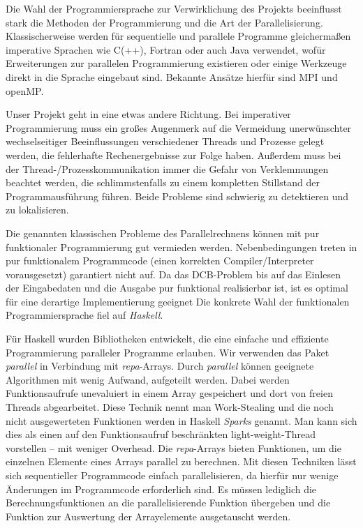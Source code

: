 \documentclass[a4paper]{scrartcl}
\begin{document}
Die Wahl der Programmiersprache zur Verwirklichung des Projekts beeinflusst stark die Methoden der Programmierung und die Art der Parallelisierung. Klassischerweise werden für sequentielle und parallele Programme gleichermaßen imperative Sprachen wie C(++), Fortran oder auch Java verwendet, wofür Erweiterungen zur parallelen Programmierung existieren oder einige Werkzeuge direkt in die Sprache eingebaut sind. Bekannte Ansätze hierfür sind MPI und openMP. \par
Unser Projekt geht in eine etwas andere Richtung. Bei imperativer Programmierung muss ein großes Augenmerk auf die Vermeidung unerwünschter wechselseitiger Beeinflussungen verschiedener Threads und Prozesse gelegt werden, die fehlerhafte Rechenergebnisse zur Folge haben. Außerdem muss bei der Thread-/Prozesskommunikation immer die Gefahr von Verklemmungen beachtet werden, die schlimmstenfalls zu einem kompletten Stillstand der Programmausführung führen. Beide Probleme sind schwierig zu detektieren und zu lokalisieren.\par
Die genannten klassischen Probleme des Parallelrechnens können mit pur funktionaler Programmierung gut vermieden werden. Nebenbedingungen treten in pur funktionalem Programmcode (einen korrekten Compiler/Interpreter vorausgesetzt) garantiert nicht auf. Da das DCB-Problem bis auf das Einlesen der Eingabedaten und die Ausgabe pur funktional realisierbar ist, ist es optimal für eine derartige Implementierung geeignet Die konkrete Wahl der funktionalen Programmiersprache fiel auf \emph{Haskell}. \par
\medskip
Für Haskell wurden Bibliotheken entwickelt, die eine einfache und effiziente Programmierung paralleler Programme erlauben. Wir verwenden das Paket \emph{parallel} in Verbindung mit \emph{repa}-Arrays. Durch \emph{parallel} können geeignete Algorithmen mit wenig Aufwand, aufgeteilt werden. Dabei werden Funktionsaufrufe unevaluiert in einem Array gespeichert und dort von freien Threads abgearbeitet. Diese Technik nennt man Work-Stealing und die noch nicht ausgewerteten Funktionen werden in Haskell \emph{Sparks} genannt. Man kann sich dies als einen auf den Funktionsaufruf beschränkten light-weight-Thread vorstellen -- mit weniger Overhead. Die \emph{repa}-Arrays bieten Funktionen, um die einzelnen Elemente eines Arrays parallel zu berechnen. Mit diesen Techniken lässt sich sequentieller Programmcode einfach parallelisieren, da hierfür nur wenige Änderungen im Programmcode erforderlich sind. Es müssen lediglich die Berechnungsfunktionen an die parallelisierende Funktion übergeben und die Funktion zur Auswertung der Arrayelemente ausgetauscht werden. \par
\end{document}
